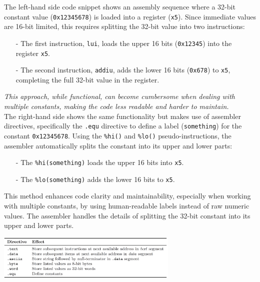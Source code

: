 The left-hand side code snippet shows an assembly sequence where a 32-bit constant value (\texttt{0x12345678}) is loaded into a register (\texttt{x5}). Since immediate values are 16-bit limited, this requires splitting the 32-bit value into two instructions: 

\begin{itemize}
    \item[-] The first instruction, \texttt{lui}, loads the upper 16 bits (\texttt{0x12345}) into the register \texttt{x5}.
    \item[-] The second instruction, \texttt{addiu}, adds the lower 16 bits (\texttt{0x678}) to \texttt{x5}, completing the full 32-bit value in the register.
\end{itemize}

\textit{This approach, while functional, can become cumbersome when dealing with multiple constants, making the code less readable and harder to maintain. \\
} 
\vspace*{5px}
The right-hand side shows the same functionality but makes use of assembler directives, specifically the \texttt{.equ} directive to define a label (\texttt{something}) for the constant \texttt{0x12345678}. Using the \texttt{\%hi()} and \texttt{\%lo()} pseudo-instructions, the assembler automatically splits the constant into its upper and lower parts:

\begin{itemize}
    \item[-] The \texttt{\%hi(something)} loads the upper 16 bits into \texttt{x5}.
    \item[-] The \texttt{\%lo(something)} adds the lower 16 bits to \texttt{x5}.
\end{itemize}

This method enhances code clarity and maintainability, especially when working with multiple constants, by using human-readable labels instead of raw numeric values. The assembler handles the details of splitting the 32-bit constant into its upper and lower parts.
\begin{center} \includegraphics[width=0.65\textwidth]{chapters/chapter1b/images/directives2.png} \end{center}

